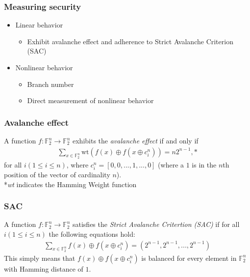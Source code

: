 \documentclass[handout]{beamer}
\newcommand{\field}[1]{\mathbb{#1}} %
\begin{document}
\begin{frame}
	\frametitle{Measuring security}
	\begin{itemize}
		\item Linear behavior
		\begin{itemize}
			\item Exhibit avalanche effect and adherence to Strict Avalanche Criterion (SAC)
		\end{itemize}
		\item Nonlinear behavior
		\begin{itemize}
			\item Branch number
			\item Direct measurement of nonlinear behavior
		\end{itemize}
	\end{itemize}
\end{frame}

\begin{frame}
	\frametitle{Avalanche effect}
A function $f : \field{F}_2^n \to \field{F}_2^n$ exhibits the \emph{avalanche effect} if and only if 
	\begin{eqnarray*}
		\sum_{x \in \field{F}_2^n} \text{wt}(f(x) \oplus f(x \oplus c_{i}^{n})) = n2^{n-1},*
	\end{eqnarray*}
	for all $i (1 \leq i \leq n)$, where $c_{i}^{n} = [0, 0, ..., 1, ..., 0]$ (where a $1$ is in the $n$th position of the vector of cardinality $n$). \\
	\vspace{0.25cm}
	*\emph{wt} indicates the Hamming Weight function
\end{frame}

\begin{frame}
	\frametitle{SAC}
	A function $f : \field{F}_2^n \to \field{F}_2^n$ satisfies the \emph{Strict Avalanche Critertion (SAC)} if for all $i (1 \leq i \leq n)$ the following equations hold:
	\begin{eqnarray*}
		\sum_{x \in \field{F}_2^n} f(x) \oplus f(x \oplus c_i^n) = (2^{n-1}, 2^{n-1}, ..., 2^{n-1})
	\end{eqnarray*}
	This simply means that $f(x) \oplus f(x \oplus c_i^n)$ is balanced for every element in $\field{F}_2^n$ with Hamming distance of $1$. 
\end{frame}

\end{document}
